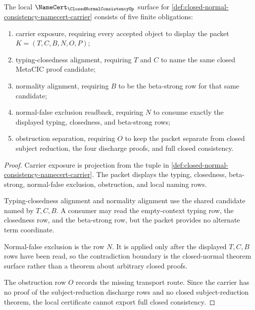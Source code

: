 \begin{theorem}
\label{thm:closed-normal-consistency-namecert-obligations}
The local $\NameCert_{\ClosedNormalConsistencyUp}$ surface for \autoref{def:closed-normal-consistency-namecert-carrier} consists of five finite obligations:
\begin{enumerate}
\item carrier exposure, requiring every accepted object to display the packet $K=(T,C,B,N,O,P)$;
\item typing-closedness alignment, requiring $T$ and $C$ to name the same closed MetaCIC proof candidate;
\item normality alignment, requiring $B$ to be the beta-strong row for that same candidate;
\item normal-false exclusion readback, requiring $N$ to consume exactly the displayed typing, closedness, and beta-strong rows;
\item obstruction separation, requiring $O$ to keep the packet separate from closed subject reduction, the four discharge proofs, and full closed consistency.
\end{enumerate}
\end{theorem}
\begin{proof}
Carrier exposure is projection from the tuple in \autoref{def:closed-normal-consistency-namecert-carrier}. The packet displays the typing, closedness, beta-strong, normal-false exclusion, obstruction, and local naming rows.

Typing-closedness alignment and normality alignment use the shared candidate named by $T,C,B$. A consumer may read the empty-context typing row, the closedness row, and the beta-strong row, but the packet provides no alternate term coordinate.

Normal-false exclusion is the row $N$. It is applied only after the displayed $T,C,B$ rows have been read, so the contradiction boundary is the closed-normal theorem surface rather than a theorem about arbitrary closed proofs.

The obstruction row $O$ records the missing transport route. Since the carrier has no proof of the subject-reduction discharge rows and no closed subject-reduction theorem, the local certificate cannot export full closed consistency.
\end{proof}

